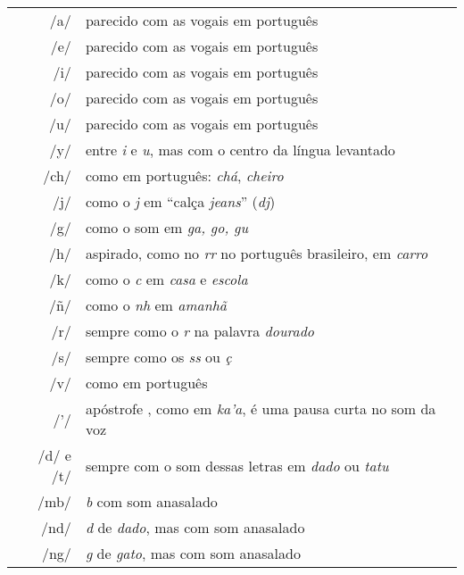 \begingroup%
\begin{tabular}{rl}
/a/ & parecido com as vogais em português\\
/e/ & parecido com as vogais em português\\
/i/ & parecido com as vogais em português\\
/o/ & parecido com as vogais em português\\
/u/ & parecido com as vogais em português\\
/y/ & entre \textit{i} e \textit{u}, mas com o centro da língua levantado\\
/ch/ & como em português: \textit{chá}, \textit{cheiro}\\
/j/ & como o \textit{j} em ``calça \textit{jeans}'' (\textit{dj})\\
/g/ & como o som em \textit{ga, go, gu }\\
/h/ & aspirado, como no \textit{rr} no português brasileiro, em \textit{carro}\\
/k/ & como o \textit{c} em \textit{casa} e \textit{escola}\\
/ñ/ & como o \textit{nh} em \textit{amanhã}\\
/r/ & sempre como o \textit{r} na palavra \textit{dourado}\\
/s/ & sempre como os \textit{ss} ou \textit{ç}\\
/v/ & como em português\\
/'/ & apóstrofe , como em \textit{ka'a}, é uma pausa curta no som da voz\\
/d/ e /t/ & sempre com o som dessas letras em \textit{dado} ou \textit{tatu}\\
/mb/ & \textit{b} com som anasalado\\
/nd/ & \textit{d} de \textit{dado}, mas com som anasalado\\
/ng/ & \textit{g} de \textit{gato}, mas com som anasalado
\end{tabular}
\endgroup
